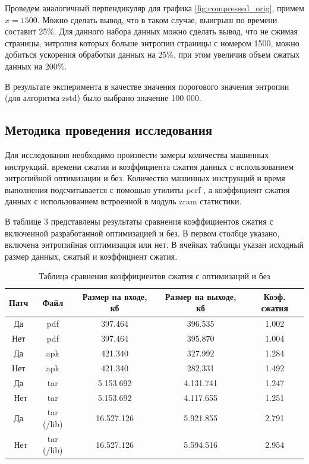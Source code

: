 Проведем аналогичный перпендикуляр для графика \ref{fig:compressed_orig}, примем $x = 1500$. Можно сделать вывод, что в таком случае, выигрыш по времени составит 25\%. Для данного набора данных можно сделать вывод, что не сжимая страницы, энтропия которых больше энтропии страницы с номером 1500, можно добиться ускорения обработки данных на 25\%, при этом увеличив объем сжатых данных на 200\%.

В результате эксперимента в качестве значения порогового значения энтропии (для алгоритма zstd) было выбрано значение 100 000.

\subsection{Методика проведения исследования}

Для исследования необходимо произвести замеры количества машинных инструкций, времени сжатия и коэффициента сжатия данных с использованием энтропийной оптимизации и без. Количество машинных инструкций и время выполнения подсчитывается с помощью утилиты perf \cite{perf}, а коэффициент сжатия данных с использованием встроенной в модуль zram статистики.

В таблице 3 представлены результаты сравнения коэффициентов сжатия с включенной разработанной оптимизацией и без. В первом столбце указано, включена энтропийная оптимизация или нет. В ячейках таблицы указан исходный размер данных, сжатый и коэффициент сжатия.

\begin{table}[!htb]
	\label{table:coeffs}
	\begin{center}
		\caption{Таблица сравнения коэффициентов сжатия с оптимизаций и без}
		\begin{tabular}{|c|c|c|c|c|}
			\hline
			\bfseries Патч & \bfseries Файл & \bfseries Размер на входе, кб & \bfseries  Размер на выходе, кб & \bfseries Коэф. сжатия \\
			\hline
			Да & pdf & 397.464 & 396.535 & 1.002 \\ 
			Нет & pdf & 397.464 & 395.870 & 1.004 \\ \hline
			Да & apk & 421.340 & 327.992 & 1.284 \\ 
			Нет & apk & 421.340 &  282.331 & 1.492 \\ \hline
			Да & tar & 5.153.692 & 4.131.741 & 1.247 \\ \
			Нет & tar & 5.153.692 & 4.117.655 & 1.251 \\ \hline
			Да & tar (/lib) & 16.527.126 & 5.921.855 & 2.791 \\ \
			Нет & tar (/lib) & 16.527.126 & 5.594.516 & 2.954 \\ \hline
		\end{tabular}
	\end{center}
\end{table}

